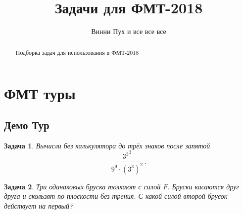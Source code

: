 \documentclass[12pt]{article}
\theoremstyle{break}
\newtheorem{problem}{Задача}[subsection]
\begin{document}
\title{Задачи для ФМТ-2018}
\author{Винни Пух и все все все}

\maketitle



\begin{abstract}
Подборка задач для использования в ФМТ-2018
\end{abstract}

\tableofcontents

\newpage
\section{ФМТ туры}


\subsection{Демо Тур}





\begin{problem}
Вычисли без калькулятора до трёх знаков после запятой
\[
	\frac{{3^{3}}^{3}}{9^{9}\cdot \left(3^{3}\right)^{2}}\,.
\]
\end{problem}

\begin{problem}
Три одинаковых бруска толкают с силой $F$. Бруски касаются друг друга и
скользят по плоскости без трения.
С какой силой второй брусок действует на первый?

\begin{minipage}{0.8\textwidth}
\begin{center}
\end{center}
\end{minipage}

\end{problem}
\end{document}

